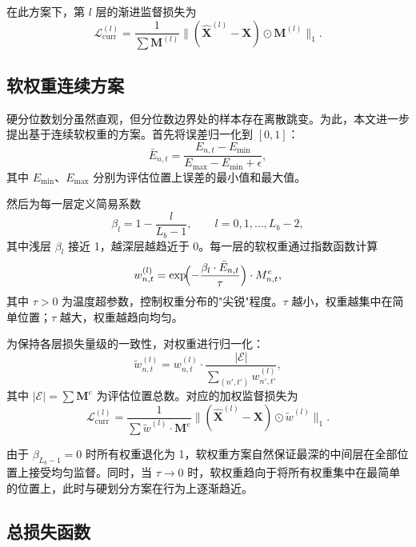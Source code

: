在此方案下，第 $l$ 层的渐进监督损失为
\begin{equation}
\mathcal{L}^{(l)}_{\mathrm{curr}} = \frac{1}{\sum \mathbf{M}^{(l)}}
\bigl\|(\hat{\mathbf{X}}^{(l)} - \mathbf{X}) \odot \mathbf{M}^{(l)}\bigr\|_1.
\end{equation}

\subsection{软权重连续方案}

硬分位数划分虽然直观，但分位数边界处的样本存在离散跳变。为此，本文进一步提出基于连续软权重的方案。首先将误差归一化到 $[0,1]$：
\begin{equation}
\bar{E}_{n,t} = \frac{E_{n,t} - E_{\min}}{E_{\max} - E_{\min} + \epsilon},
\end{equation}
其中 $E_{\min}$、$E_{\max}$ 分别为评估位置上误差的最小值和最大值。

然后为每一层定义简易系数
\begin{equation}
\beta_l = 1 - \frac{l}{L_b - 1}, \qquad l=0,1,\dots,L_b-2,
\end{equation}
其中浅层 $\beta_l$ 接近 1，越深层越趋近于 0。每一层的软权重通过指数函数计算
\begin{equation}
w^{(l)}_{n,t} = \exp\!\Bigl(-\frac{\beta_l \cdot \bar{E}_{n,t}}{\tau}\Bigr) \cdot M^{e}_{n,t},
\end{equation}
其中 $\tau > 0$ 为温度超参数，控制权重分布的"尖锐"程度。$\tau$ 越小，权重越集中在简单位置；$\tau$ 越大，权重越趋向均匀。

为保持各层损失量级的一致性，对权重进行归一化：
\begin{equation}
\tilde{w}^{(l)}_{n,t} = w^{(l)}_{n,t} \cdot \frac{|\mathcal{E}|}{\sum_{(n',t')} w^{(l)}_{n',t'}},
\end{equation}
其中 $|\mathcal{E}| = \sum \mathbf{M}^{e}$ 为评估位置总数。对应的加权监督损失为
\begin{equation}
\mathcal{L}^{(l)}_{\mathrm{curr}} = \frac{1}{\sum \tilde{w}^{(l)} \cdot \mathbf{M}^{e}}
\bigl\|(\hat{\mathbf{X}}^{(l)} - \mathbf{X}) \odot \tilde{w}^{(l)}\bigr\|_1.
\end{equation}

由于 $\beta_{L_b-1}=0$ 时所有权重退化为 1，软权重方案自然保证最深的中间层在全部位置上接受均匀监督。同时，当 $\tau \to 0$ 时，软权重趋向于将所有权重集中在最简单的位置上，此时与硬划分方案在行为上逐渐趋近。

\subsection{总损失函数}

